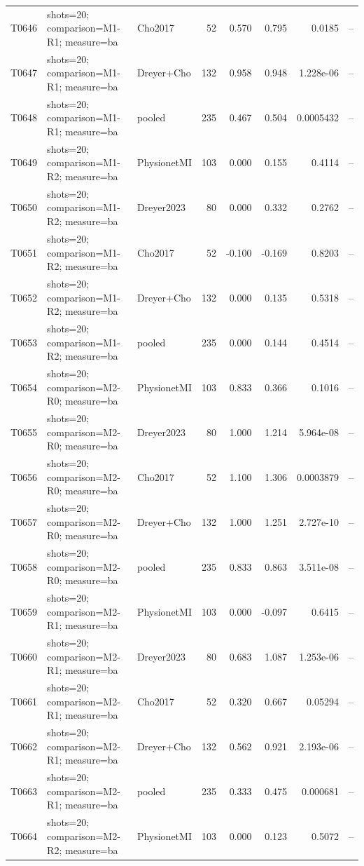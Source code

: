 \begin{longtable}{p{.45in}p{2.6in}p{.75in}rrrrr}
T0646 & shots=20; comparison=M1-R1; measure=ba & Cho2017 & 52 & 0.570 & 0.795 & 0.0185 & -- \\
T0647 & shots=20; comparison=M1-R1; measure=ba & Dreyer+Cho & 132 & 0.958 & 0.948 & 1.228e-06 & -- \\
T0648 & shots=20; comparison=M1-R1; measure=ba & pooled & 235 & 0.467 & 0.504 & 0.0005432 & -- \\
T0649 & shots=20; comparison=M1-R2; measure=ba & PhysionetMI & 103 & 0.000 & 0.155 & 0.4114 & -- \\
T0650 & shots=20; comparison=M1-R2; measure=ba & Dreyer2023 & 80 & 0.000 & 0.332 & 0.2762 & -- \\
T0651 & shots=20; comparison=M1-R2; measure=ba & Cho2017 & 52 & -0.100 & -0.169 & 0.8203 & -- \\
T0652 & shots=20; comparison=M1-R2; measure=ba & Dreyer+Cho & 132 & 0.000 & 0.135 & 0.5318 & -- \\
T0653 & shots=20; comparison=M1-R2; measure=ba & pooled & 235 & 0.000 & 0.144 & 0.4514 & -- \\
T0654 & shots=20; comparison=M2-R0; measure=ba & PhysionetMI & 103 & 0.833 & 0.366 & 0.1016 & -- \\
T0655 & shots=20; comparison=M2-R0; measure=ba & Dreyer2023 & 80 & 1.000 & 1.214 & 5.964e-08 & -- \\
T0656 & shots=20; comparison=M2-R0; measure=ba & Cho2017 & 52 & 1.100 & 1.306 & 0.0003879 & -- \\
T0657 & shots=20; comparison=M2-R0; measure=ba & Dreyer+Cho & 132 & 1.000 & 1.251 & 2.727e-10 & -- \\
T0658 & shots=20; comparison=M2-R0; measure=ba & pooled & 235 & 0.833 & 0.863 & 3.511e-08 & -- \\
T0659 & shots=20; comparison=M2-R1; measure=ba & PhysionetMI & 103 & 0.000 & -0.097 & 0.6415 & -- \\
T0660 & shots=20; comparison=M2-R1; measure=ba & Dreyer2023 & 80 & 0.683 & 1.087 & 1.253e-06 & -- \\
T0661 & shots=20; comparison=M2-R1; measure=ba & Cho2017 & 52 & 0.320 & 0.667 & 0.05294 & -- \\
T0662 & shots=20; comparison=M2-R1; measure=ba & Dreyer+Cho & 132 & 0.562 & 0.921 & 2.193e-06 & -- \\
T0663 & shots=20; comparison=M2-R1; measure=ba & pooled & 235 & 0.333 & 0.475 & 0.000681 & -- \\
T0664 & shots=20; comparison=M2-R2; measure=ba & PhysionetMI & 103 & 0.000 & 0.123 & 0.5072 & -- \\

\end{longtable}
